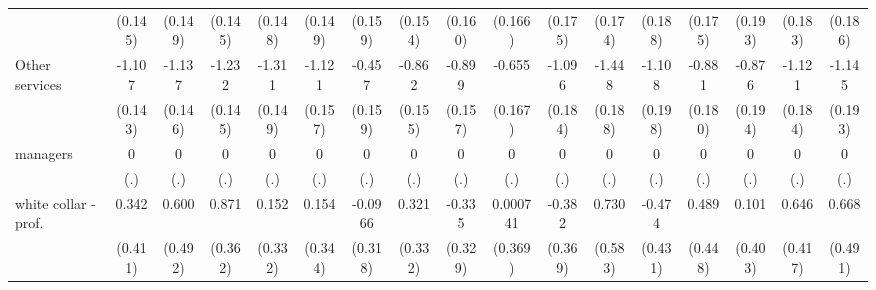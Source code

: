 {\begin{tabular}{l*{16}{c}}
                    &     (0.145)         &     (0.149)         &     (0.145)         &     (0.148)         &     (0.149)         &     (0.159)         &     (0.154)         &     (0.160)         &     (0.166)         &     (0.175)         &     (0.174)         &     (0.188)         &     (0.175)         &     (0.193)         &     (0.183)         &     (0.186)         \\
[1em]
Other services      &      -1.107\sym{***}&      -1.137\sym{***}&      -1.232\sym{***}&      -1.311\sym{***}&      -1.121\sym{***}&      -0.457\sym{**} &      -0.862\sym{***}&      -0.899\sym{***}&      -0.655\sym{***}&      -1.096\sym{***}&      -1.448\sym{***}&      -1.108\sym{***}&      -0.881\sym{***}&      -0.876\sym{***}&      -1.121\sym{***}&      -1.145\sym{***}\\
                    &     (0.143)         &     (0.146)         &     (0.145)         &     (0.149)         &     (0.157)         &     (0.159)         &     (0.155)         &     (0.157)         &     (0.167)         &     (0.184)         &     (0.188)         &     (0.198)         &     (0.180)         &     (0.194)         &     (0.184)         &     (0.193)         \\
[1em]
managers            &           0         &           0         &           0         &           0         &           0         &           0         &           0         &           0         &           0         &           0         &           0         &           0         &           0         &           0         &           0         &           0         \\
                    &         (.)         &         (.)         &         (.)         &         (.)         &         (.)         &         (.)         &         (.)         &         (.)         &         (.)         &         (.)         &         (.)         &         (.)         &         (.)         &         (.)         &         (.)         &         (.)         \\
[1em]
white collar - prof.&       0.342         &       0.600         &       0.871\sym{*}  &       0.152         &       0.154         &     -0.0966         &       0.321         &      -0.335         &    0.000741         &      -0.382         &       0.730         &      -0.474         &       0.489         &       0.101         &       0.646         &       0.668         \\
                    &     (0.411)         &     (0.492)         &     (0.362)         &     (0.332)         &     (0.344)         &     (0.318)         &     (0.332)         &     (0.329)         &     (0.369)         &     (0.369)         &     (0.583)         &     (0.431)         &     (0.448)         &     (0.403)         &     (0.417)         &     (0.491)         \\

\end{tabular}}
